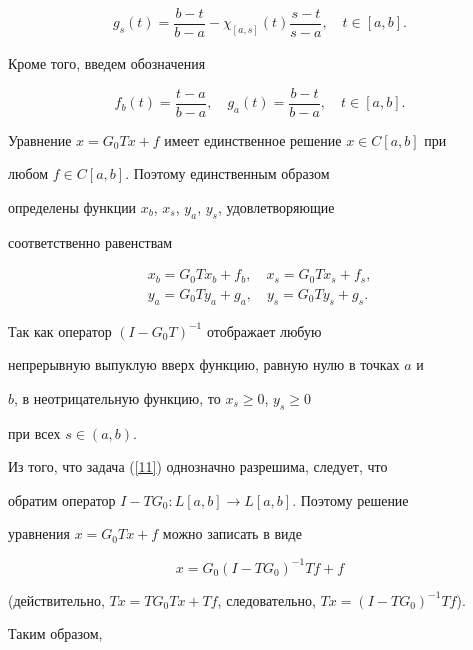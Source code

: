 \begin{pf}
\begin{gather*}
g_s(t)=


\dfrac{b-t}{b-a}-\chi_{[a,s]}(t)\dfrac{s-t}{s-a},\quad t\in[a,b].


\end{gather*}


Кроме того, введем обозначения


$$


f_b(t)=\dfrac{t-a}{b-a},\quad


g_a(t)=\dfrac{b-t}{b-a},\quad t\in[a,b].


$$





Уравнение $x=G_0Tx+f$ имеет единственное решение $x\in C[a,b]$ при


любом $f\in C[a,b]$. Поэтому единственным образом


определены функции $x_b$, $x_s$, $y_a$, $y_s$, удовлетворяющие


соответственно равенствам


\begin{gather*}


x_b=G_0Tx_b+f_b,\quad x_s=G_0Tx_s+f_s,\\


y_a=G_0Ty_a+g_a,\quad y_s=G_0Ty_s+g_s.


\end{gather*}





Так как оператор $(I-G_0T)^{-1}$ отображает любую


непрерывную выпуклую вверх функцию, равную нулю в точках $a$ и


$b$, в неотрицательную функцию, то $x_s\ge0$, $y_s\ge0$


при всех $s\in(a,b)$.





Из того, что задача (\ref{11}) однозначно разрешима, следует, что


обратим оператор $I-TG_0:L[a,b]\to L[a,b]$. Поэтому решение


уравнения $x=G_0Tx+f$ можно записать в виде


$$


x=G_0(I-TG_0)^{-1}Tf+f


$$


(действительно, $Tx=TG_0Tx+Tf$, следовательно, $Tx=(I-TG_0)^{-1}Tf$).





Таким образом,



\end{pf}
